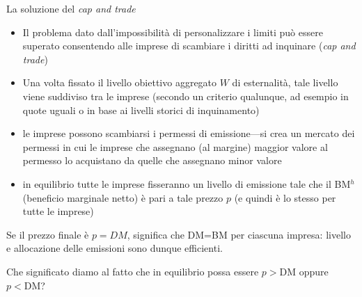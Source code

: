 \documentclass[aspectratio=64,11pt]{beamer}
\begin{document}
\begin{frame}{La soluzione del \emph{cap and trade}}
\begin{itemize}
\item Il problema dato dall'impossibilità di personalizzare i limiti può essere
superato consentendo alle imprese di scambiare i diritti ad inquinare (\emph{cap
and trade})
\item Una volta fissato il livello obiettivo aggregato $W$ di esternalità, tale
livello viene suddiviso tra le imprese (secondo un criterio qualunque, ad
esempio in quote uguali o in base ai livelli storici di inquinamento)
\item le imprese possono scambiarsi i permessi di emissione---si crea un mercato
dei permessi in cui le imprese che assegnano (al margine) maggior valore al
permesso lo acquistano da quelle che assegnano minor valore
\item in equilibrio tutte le imprese fisseranno un livello di emissione tale che
il BM$^{h}$ (beneficio marginale netto) è pari a tale prezzo $p$ (e quindi è
lo stesso per tutte le imprese)
\end{itemize}
\begin{block}{}
Se il prezzo finale è $p=DM$, significa che DM=BM per ciascuna impresa:
livello e allocazione delle emissioni sono dunque efficienti.

Che significato diamo al fatto che in equilibrio possa essere $p>\text{DM}$
oppure $p<\text{DM}$?
\end{block}
\end{frame}
\end{document}

